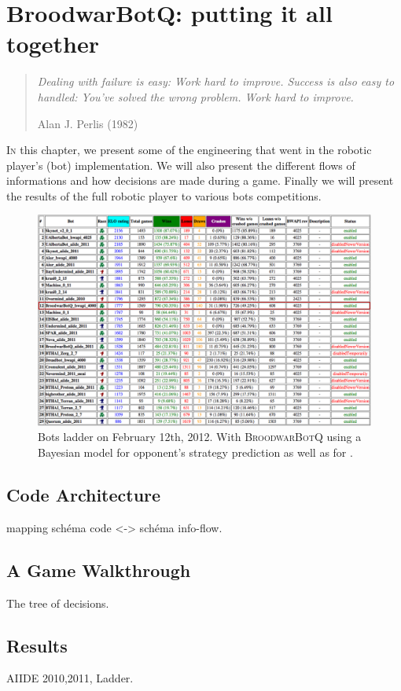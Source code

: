 \chapter{BroodwarBotQ: putting it all together}
\label{chapter:bot}

\begin{quotation}
\textit{Dealing with failure is easy: Work hard to improve. Success is also easy to handled: You've solved the wrong problem. Work hard to improve.}\\
\begin{flushright}Alan J. Perlis (1982)\end{flushright}
\end{quotation}

\lettrine{I}{n} this chapter, we present some of the engineering that went in the robotic player's (bot) implementation. We will also present the different flows of informations and how decisions are made during a game. Finally we will present the results of the full robotic player to various bots competitions.

\chaptertoc

\begin{figure}
\includegraphics[width=1.0\columnwidth]{images/ladder_2012-02-12.png}
\caption{Bots ladder on February 12th, 2012. With \textsc{BroodwarBotQ} using a Bayesian model for opponent's strategy prediction as well as for .}
\end{figure}


\section{Code Architecture}
mapping schéma code <-> schéma info-flow.


\section{A Game Walkthrough}
The tree of decisions.


\section{Results}
AIIDE 2010,2011, Ladder.


